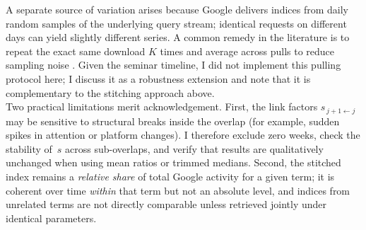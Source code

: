 \documentclass[12pt,a4paper]{article}
\begin{document}
A separate source of variation arises because Google delivers indices from daily random samples of the underlying query stream; identical requests on different days can yield slightly different series. A common remedy in the literature is to repeat the exact same download $K$ times and average across pulls to reduce sampling noise \parencite[e.g.,][]{CarriereSwallowLabbe2013}.
Given the seminar timeline, I did not implement this pulling protocol here; I discuss it as a robustness extension and note that it is complementary to the stitching approach above.
\\
Two practical limitations merit acknowledgement. First, the link factors $s_{\,j{+}1 \leftarrow j}$ may be sensitive to structural breaks inside the overlap (for example, sudden spikes in attention or platform changes). I therefore exclude zero weeks, check the stability of~$s$ across sub-overlaps, and verify that results are qualitatively unchanged when using mean ratios or trimmed medians. Second, the stitched index remains a \emph{relative share} of total Google activity for a given term; it is coherent over time \emph{within} that term but not an absolute level, and indices from unrelated terms are not directly comparable unless retrieved jointly under identical parameters.
\end{document}
